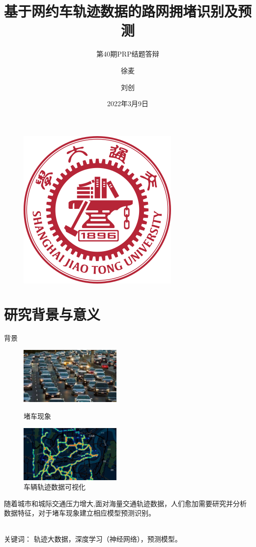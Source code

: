 \documentclass[10pt]{beamer}
\author{徐麦 \and 刘创}
\title{基于网约车轨迹数据的路网拥堵识别及预测}
\subtitle{第40期PRP结题答辩}
\institute{上海交通大学密西根学院}
\date{2022年3月9日}
\begin{document}
\heiti
\begin{frame}
    \titlepage
    \begin{figure}[htpb]
        \begin{center}
            \includegraphics[width=0.18\linewidth]{pic/SJTU.png}
        \end{center}
    \end{figure}
\end{frame}

\begin{frame}
    \tableofcontents[sectionstyle=show,subsectionstyle=show/shaded/hide,subsubsectionstyle=show/shaded/hide]
\end{frame}


\section{研究背景与意义}

\begin{frame}{背景}
\begin{figure}
\centering
\begin{minipage}[t]{0.48\textwidth}
\centering
\includegraphics[width=5cm]{pic/1.png}
\caption{堵车现象}
\end{minipage}
\begin{minipage}[t]{0.48\textwidth}
\centering
\includegraphics[width=5cm]{pic/2.png}
\caption{车辆轨迹数据可视化}
\end{minipage}
\end{figure}
\par 随着城市和城际交通压力增大,面对海量交通轨迹数据，人们愈加需要\alert{研究并分析数据特征}，对于堵车现象建立相应\alert{模型预测识别}。
\\ \hspace*{\fill} \\
\par 关键词：\color{blue} 轨迹大数据，深度学习（神经网络），预测模型。
\end{frame}
\end{document}

